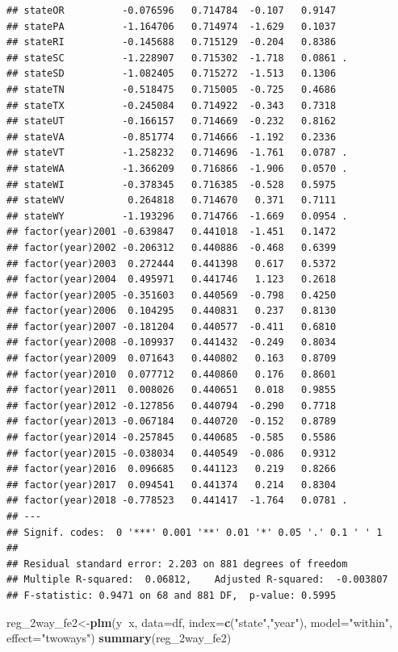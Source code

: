 \documentclass[]{book}
\newenvironment{Shaded}{\begin{snugshade}}{\end{snugshade}}
\newcommand{\KeywordTok}[1]{\textcolor[rgb]{0.13,0.29,0.53}{\textbf{#1}}}
\newcommand{\DataTypeTok}[1]{\textcolor[rgb]{0.13,0.29,0.53}{#1}}
\newcommand{\StringTok}[1]{\textcolor[rgb]{0.31,0.60,0.02}{#1}}
\newcommand{\OperatorTok}[1]{\textcolor[rgb]{0.81,0.36,0.00}{\textbf{#1}}}
\newcommand{\NormalTok}[1]{#1}
\theoremstyle{definition}
\theoremstyle{definition}
\theoremstyle{definition}
\theoremstyle{remark}
\begin{document}
\begin{verbatim}
## stateOR          -0.076596   0.714784  -0.107   0.9147    
## statePA          -1.164706   0.714974  -1.629   0.1037    
## stateRI          -0.145688   0.715129  -0.204   0.8386    
## stateSC          -1.228907   0.715302  -1.718   0.0861 .  
## stateSD          -1.082405   0.715272  -1.513   0.1306    
## stateTN          -0.518475   0.715005  -0.725   0.4686    
## stateTX          -0.245084   0.714922  -0.343   0.7318    
## stateUT          -0.166157   0.714669  -0.232   0.8162    
## stateVA          -0.851774   0.714666  -1.192   0.2336    
## stateVT          -1.258232   0.714696  -1.761   0.0787 .  
## stateWA          -1.366209   0.716866  -1.906   0.0570 .  
## stateWI          -0.378345   0.716385  -0.528   0.5975    
## stateWV           0.264818   0.714670   0.371   0.7111    
## stateWY          -1.193296   0.714766  -1.669   0.0954 .  
## factor(year)2001 -0.639847   0.441018  -1.451   0.1472    
## factor(year)2002 -0.206312   0.440886  -0.468   0.6399    
## factor(year)2003  0.272444   0.441398   0.617   0.5372    
## factor(year)2004  0.495971   0.441746   1.123   0.2618    
## factor(year)2005 -0.351603   0.440569  -0.798   0.4250    
## factor(year)2006  0.104295   0.440831   0.237   0.8130    
## factor(year)2007 -0.181204   0.440577  -0.411   0.6810    
## factor(year)2008 -0.109937   0.441432  -0.249   0.8034    
## factor(year)2009  0.071643   0.440802   0.163   0.8709    
## factor(year)2010  0.077712   0.440860   0.176   0.8601    
## factor(year)2011  0.008026   0.440651   0.018   0.9855    
## factor(year)2012 -0.127856   0.440794  -0.290   0.7718    
## factor(year)2013 -0.067184   0.440720  -0.152   0.8789    
## factor(year)2014 -0.257845   0.440685  -0.585   0.5586    
## factor(year)2015 -0.038034   0.440549  -0.086   0.9312    
## factor(year)2016  0.096685   0.441123   0.219   0.8266    
## factor(year)2017  0.094541   0.441374   0.214   0.8304    
## factor(year)2018 -0.778523   0.441417  -1.764   0.0781 .  
## ---
## Signif. codes:  0 '***' 0.001 '**' 0.01 '*' 0.05 '.' 0.1 ' ' 1
## 
## Residual standard error: 2.203 on 881 degrees of freedom
## Multiple R-squared:  0.06812,    Adjusted R-squared:  -0.003807 
## F-statistic: 0.9471 on 68 and 881 DF,  p-value: 0.5995
\end{verbatim}

\begin{Shaded}
\begin{Highlighting}[]
\NormalTok{reg_2way_fe2<-}\KeywordTok{plm}\NormalTok{(y}\OperatorTok{~}\NormalTok{x, }\DataTypeTok{data=}\NormalTok{df, }\DataTypeTok{index=}\KeywordTok{c}\NormalTok{(}\StringTok{"state"}\NormalTok{,}\StringTok{"year"}\NormalTok{), }\DataTypeTok{model=}\StringTok{"within"}\NormalTok{, }\DataTypeTok{effect=}\StringTok{"twoways"}\NormalTok{)}
\KeywordTok{summary}\NormalTok{(reg_2way_fe2)}
\end{Highlighting}
\end{Shaded}
\end{document}
